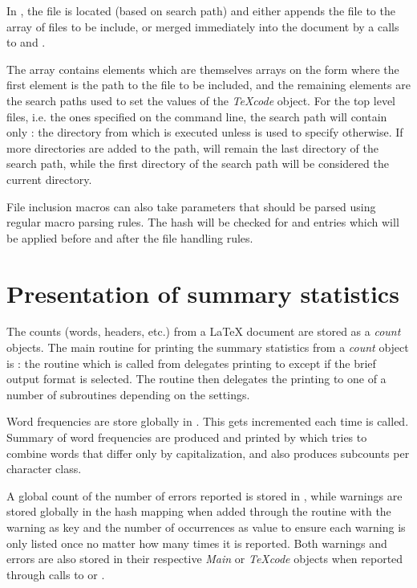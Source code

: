 \documentclass{article}
\newcommand\Obj[1]{\textsl{#1}}
\begin{document}
In , the file is located (based on search path) and either appends the file to the  array of files to be include, or merged immediately into the document by a calls to  and .

The  array contains elements which are themselves arrays on the form  where the first element is the path to the file to be included, and the remaining elements are the search paths used to set the  values of the \Obj{TeXcode} object. For the top level files, i.e. the ones specified on the command line, the search path will contain only : the directory from which \TeXcount{} is executed unless  is used to specify otherwise. If more directories are added to the path,  will remain the last directory of the search path, while the first directory of the search path will be considered the current directory.

File inclusion macros can also take parameters that should be parsed using regular macro parsing rules. The  hash will be checked for  and  entries which will be applied before and after the file handling rules.



\section{Presentation of summary statistics}

The counts (words, headers, etc.) from a \LaTeX{} document are stored as a \Obj{count} objects. The main routine for printing the summary statistics from a \Obj{count} object is : the routine  which is called from  delegates printing to  except if the brief output format is selected. The  routine then delegates the printing to one of a number of subroutines depending on the settings.

Word frequencies are store globally in . This gets incremented each time  is called. Summary of word frequencies are produced and printed by  which tries to combine words that differ only by capitalization, and also produces subcounts per character class.

A global count of the number of errors reported is stored in , while warnings are stored globally in the  hash mapping when added through the  routine with the warning as key and the number of occurrences as value to ensure each warning is only listed once no matter how many times it is reported. Both warnings and errors are also stored in their respective \Obj{Main} or \Obj{TeXcode} objects when reported through calls to  or .
\end{document}
